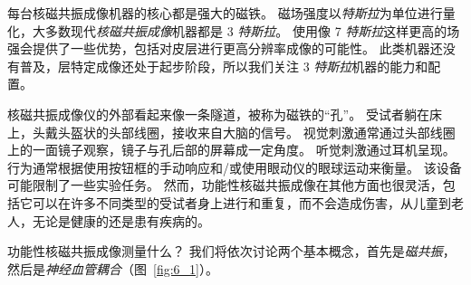 每台核磁共振成像机器的核心都是强大的磁铁。
磁场强度以\textit{特斯拉}为单位进行量化，大多数现代\textit{核磁共振成像}机器都是 3 \textit{特斯拉}。
使用像 7 \textit{特斯拉}这样更高的场强会提供了一些优势，包括对皮层进行更高分辨率成像的可能性。
此类机器还没有普及，层特定成像还处于起步阶段，所以我们关注 3 \textit{特斯拉}机器的能力和配置。


核磁共振成像仪的外部看起来像一条隧道，被称为磁铁的“孔”。
受试者躺在床上，头戴头盔状的头部线圈，接收来自大脑的信号。
视觉刺激通常通过头部线圈上的一面镜子观察，镜子与孔后部的屏幕成一定角度。
听觉刺激通过耳机呈现。
行为通常根据使用按钮框的手动响应和/或使用眼动仪的眼球运动来衡量。
该设备可能限制了一些实验任务。
然而，功能性核磁共振成像在其他方面也很灵活，包括它可以在许多不同类型的受试者身上进行和重复，而不会造成伤害，从儿童到老人，无论是健康的还是患有疾病的。


功能性核磁共振成像测量什么？
我们将依次讨论两个基本概念，首先是\textit{磁共振}，然后是\textit{神经血管耦合}（图~\ref{fig:6_1}）。


